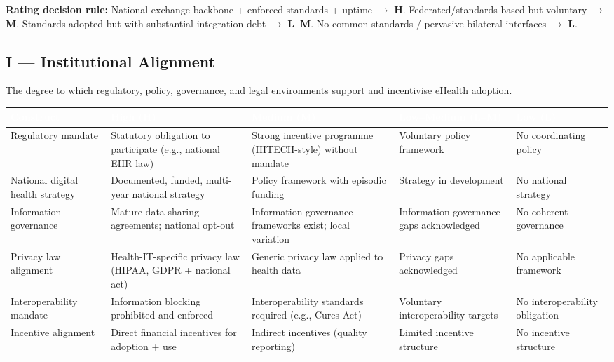 \noindent\textbf{Rating decision rule:}
National exchange backbone + enforced standards + uptime $\rightarrow$ \textbf{H}.
Federated/standards-based but voluntary $\rightarrow$ \textbf{M}.
Standards adopted but with substantial integration debt $\rightarrow$ \textbf{L--M}.
No common standards / pervasive bilateral interfaces $\rightarrow$ \textbf{L}.

\bigskip


\subsection*{I --- Institutional Alignment}

\noindent The degree to which regulatory, policy, governance, and legal environments
support and incentivise eHealth adoption.

\begin{table}[H]
\footnotesize
\begin{tabular}{p{2.5cm} p{3.1cm} p{3.1cm} p{3.1cm} p{3.1cm}}
\toprule
\rowcolor{headerblue}
\textcolor{white}{\textbf{Construct}} &
\textcolor{white}{\textbf{High (H)}} &
\textcolor{white}{\textbf{Medium (M)}} &
\textcolor{white}{\textbf{Low--Medium (L--M)}} &
\textcolor{white}{\textbf{Low (L)}} \\
\midrule

\rowcolor{rowgray}
Regulatory mandate &
Statutory obligation to participate (e.g., national EHR law) &
Strong incentive programme (HITECH-style) without mandate &
Voluntary policy framework &
No coordinating policy \\

National digital health strategy &
Documented, funded, multi-year national strategy &
Policy framework with episodic funding &
Strategy in development &
No national strategy \\

\rowcolor{rowgray}
Information governance &
Mature data-sharing agreements; national opt-out &
Information governance frameworks exist; local variation &
Information governance gaps acknowledged &
No coherent governance \\

Privacy law alignment &
Health-IT-specific privacy law (HIPAA, GDPR + national act) &
Generic privacy law applied to health data &
Privacy gaps acknowledged &
No applicable framework \\

\rowcolor{rowgray}
Interoperability mandate &
Information blocking prohibited and enforced &
Interoperability standards required (e.g., Cures Act) &
Voluntary interoperability targets &
No interoperability obligation \\

Incentive alignment &
Direct financial incentives for adoption + use &
Indirect incentives (quality reporting) &
Limited incentive structure &
No incentive structure \\

\bottomrule
\end{tabular}
\end{table}

